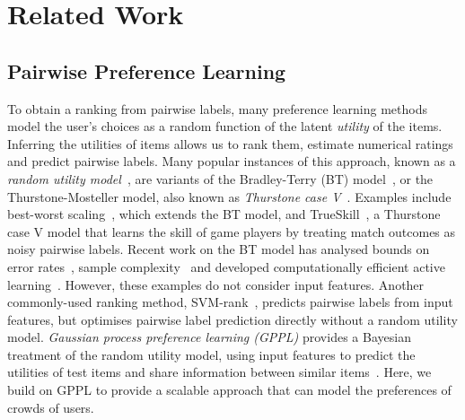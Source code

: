 

\section{Related Work}
\label{sec:rw}

\subsection{Pairwise Preference Learning} 

To obtain a ranking from pairwise labels, 
many preference learning methods model
the user's choices as a random function of the latent 
\emph{utility} of the items.
Inferring the utilities of items allows us to rank them, estimate numerical ratings
and predict pairwise labels.
Many popular instances of this approach, known as a \emph{random utility model}~\citep{thurstone1927law},
are variants of  
the Bradley-Terry (BT) model~\citep{bradley1952rank,plackett1975analysis,luce1959possible},
or the Thurstone-Mosteller model, also known as \emph{Thurstone case V}~\citep{thurstone1927law,mosteller2006remarks}.
Examples include best-worst scaling~\citet{marley2005some}, which extends the BT model,
and TrueSkill~\citep{herbrich2007trueskill}, a Thurstone case V model that learns 
the skill of game players by treating match outcomes as noisy pairwise labels.
Recent work on the BT model has analysed bounds on error rates~\citep{chen2015spectral}, 
sample complexity~\citep{shah2015estimation}
and developed computationally efficient active learning~\citet{li2018hybrid}.
However, these examples do not consider input features.
Another commonly-used ranking method, SVM-rank~\citep{joachims2002optimizing},
predicts pairwise labels from input features, but optimises
pairwise label prediction directly without a random utility model.
\emph{Gaussian process preference learning (GPPL)}
provides a Bayesian treatment of the random utility model,
using input features to predict the utilities of test items and share information
between similar items~\citep{chu2005preference}.
Here, we build on GPPL to provide a scalable approach that can 
model the preferences of crowds of users.

